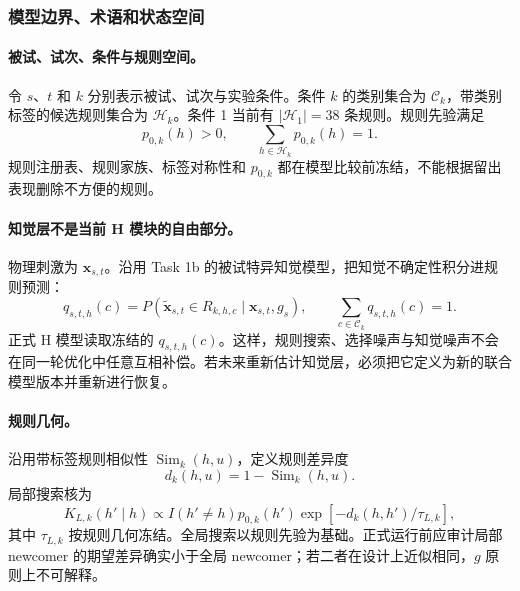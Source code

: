 \subsubsection{模型边界、术语和状态空间}

\paragraph{被试、试次、条件与规则空间。}
令 $s$、$t$ 和 $k$ 分别表示被试、试次与实验条件。条件 $k$ 的类别集合为 $\mathcal C_k$，带类别标签的候选规则集合为 $\mathcal H_k$。条件 1 当前有 $|\mathcal H_1|=38$ 条规则。规则先验满足
\begin{equation}
    p_{0,k}(h)>0,
    \qquad
    \sum_{h\in\mathcal H_k}p_{0,k}(h)=1.
    \label{eq:model0805-rule-prior}
\end{equation}
规则注册表、规则家族、标签对称性和 $p_{0,k}$ 都在模型比较前冻结，不能根据留出表现删除不方便的规则。

\paragraph{知觉层不是当前 H 模块的自由部分。}
物理刺激为 $\mathbf x_{s,t}$。沿用 Task 1b 的被试特异知觉模型，把知觉不确定性积分进规则预测：
\begin{equation}
    q_{s,t,h}(c)
    =P\!\left(
      \widetilde{\mathbf x}_{s,t}\in R_{k,h,c}
      \mid \mathbf x_{s,t},g_s
    \right),
    \qquad
    \sum_{c\in\mathcal C_k}q_{s,t,h}(c)=1.
    \label{eq:model0805-rule-prediction}
\end{equation}
正式 H 模型读取冻结的 $q_{s,t,h}(c)$。这样，规则搜索、选择噪声与知觉噪声不会在同一轮优化中任意互相补偿。若未来重新估计知觉层，必须把它定义为新的联合模型版本并重新进行恢复。

\paragraph{规则几何。}
沿用带标签规则相似性 $\operatorname{Sim}_k(h,u)$，定义规则差异度
\begin{equation}
    d_k(h,u)=1-\operatorname{Sim}_k(h,u).
    \label{eq:model0805-rule-distance}
\end{equation}
局部搜索核为
\begin{equation}
    K_{L,k}(h'\mid h)
    \propto I(h'\neq h)p_{0,k}(h')
    \exp[-d_k(h,h')/\tau_{L,k}],
    \label{eq:model0805-local-kernel}
\end{equation}
其中 $\tau_{L,k}$ 按规则几何冻结。全局搜索以规则先验为基础。正式运行前应审计局部 newcomer 的期望差异确实小于全局 newcomer；若二者在设计上近似相同，$g$ 原则上不可解释。

